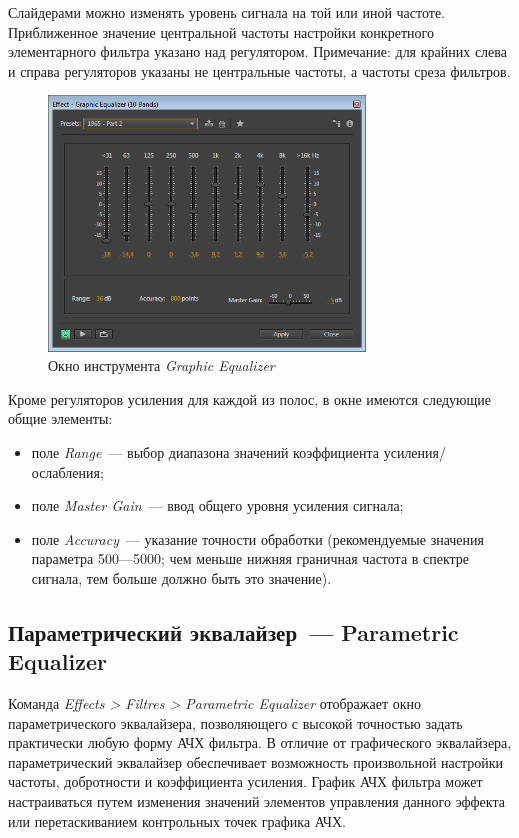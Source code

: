 \documentclass[oneside, final, 14pt]{extreport}
\begin{document}
Слайдерами можно изменять уровень сигнала на той или иной частоте. Приближенное значение центральной частоты настройки конкретного элементарного фильтра указано над регулятором. Примечание: для крайних слева и справа регуляторов указаны не центральные частоты, а частоты среза фильтров.

\begin{figure}[h]
  \centering
  \includegraphics[width=0.75\textwidth]{pic-graphic-01}
  \caption{Окно инструмента \emph{Graphic Equalizer}}
  \label{pic-graphic-01}
\end{figure}

Кроме регуляторов усиления для каждой из полос, в окне имеются следующие общие элементы:
\begin{itemize}
  \item поле \emph{Range}~--- выбор диапазона значений коэффициента усиления/ослабления;
  \item поле \emph{Master Gain}~--- ввод общего уровня усиления сигнала;
  \item поле \emph{Accuracy}~--- указание точности обработки (рекомендуемые значения параметра 500—5000; чем меньше нижняя граничная частота в спектре сигнала, тем больше должно быть это значение).
\end{itemize}

\subsection{Параметрический эквалайзер~--- Parametric Equalizer}

Команда \emph{Effects > Filtres > Parametric Equalizer} отображает окно параметрического эквалайзера, позволяющего с высокой точностью задать практически любую форму АЧХ фильтра. В отличие от графического эквалайзера, параметрический эквалайзер обеспечивает возможность произвольной настройки частоты, добротности и коэффициента усиления. График АЧХ фильтра может настраиваться путем изменения значений элементов управления данного эффекта или перетаскиванием контрольных точек графика АЧХ.
\end{document}
